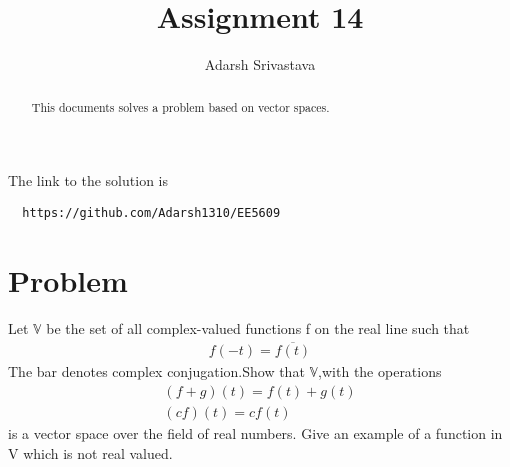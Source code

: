 \documentclass[journal,12pt,twocolumn]{IEEEtran}
\begin{document}
      \def\rightbox#1{\makebox[0in][r]{#1}}
      \def\centbox#1{\makebox[0in]{#1}}
      \def\topbox#1{\raisebox{-\baselineskip}[0in][0in]{#1}}
      \def\midbox#1{\raisebox{-0.5\baselineskip}[0in][0in]{#1}}
 \vspace{3cm}
 \title{Assignment 14}
 \author{Adarsh Srivastava}
 \maketitle
 \newpage
 \bigskip
 \renewcommand{\thetable}{\theenumi}
 The link to the solution is
 \begin{lstlisting}
  https://github.com/Adarsh1310/EE5609
 \end{lstlisting}
 \begin{abstract}
 This documents solves a problem based on vector spaces.
 \end{abstract}
  \section{\textbf{Problem}}
  Let $\mathbb{V}$ be the set of all complex-valued functions f on the real line such that
  \begin{align*}f(-t)=\overline{f(t)}\end{align*}The bar denotes complex conjugation.Show that $\mathbb{V}$,with the operations\begin{align*}(f+g)(t)=f(t)+g(t)\\(cf)(t)=cf(t)\end{align*} is a vector space over the field of real numbers. Give an example of a function in V which is not real valued.
\end{document}
